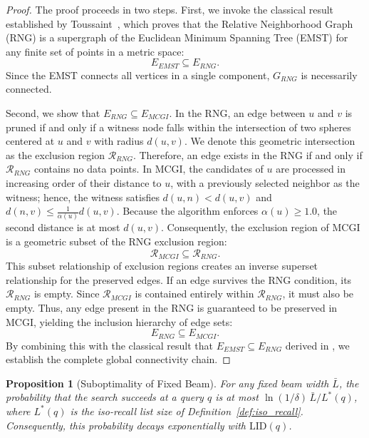 \documentclass{article}
\theoremstyle{plain}
\newtheorem{proposition}[theorem]{Proposition}
\theoremstyle{definition}
\theoremstyle{remark}
\newcommand{\ours}{MCGI\xspace}
\begin{document}
\begin{proof}
The proof proceeds in two steps. First, we invoke the classical result established by Toussaint~\cite{TOUSSAINT1980261}, which proves that the Relative Neighborhood Graph (RNG) is a supergraph of the Euclidean Minimum Spanning Tree (EMST) for any finite set of points in a metric space:
\begin{equation}
    E_{EMST} \subseteq E_{RNG}.
\end{equation}
Since the EMST connects all vertices in a single component, $G_{RNG}$ is necessarily connected.

Second, we show that $E_{RNG} \subseteq E_{MCGI}$. In the RNG, an edge between $u$ and $v$ is pruned if and only if a witness node falls within the intersection of two spheres centered at $u$ and $v$ with radius $d(u, v)$. We denote this geometric intersection as the exclusion region $\mathcal{R}_{RNG}$. Therefore, an edge exists in the RNG if and only if $\mathcal{R}_{RNG}$ contains no data points.
In \ours{}, the candidates of $u$ are processed in increasing order of their distance to $u$, with a previously selected neighbor as the witness; hence, the witness satisfies $d(u, n) < d(u, v)$ and $d(n, v) \le \frac{1}{\alpha(u)} d(u, v)$. Because the algorithm enforces $\alpha(u) \ge 1.0$, the second distance is at most $d(u, v)$. Consequently, the exclusion region of \ours{} is a geometric subset of the RNG exclusion region:
\begin{equation}
    \mathcal{R}_{MCGI} \subseteq \mathcal{R}_{RNG}.
\end{equation}
This subset relationship of exclusion regions creates an inverse superset relationship for the preserved edges. If an edge survives the RNG condition, its $\mathcal{R}_{RNG}$ is empty. Since $\mathcal{R}_{MCGI}$ is contained entirely within $\mathcal{R}_{RNG}$, it must also be empty. Thus, any edge present in the RNG is guaranteed to be preserved in \ours{}, yielding the inclusion hierarchy of edge sets:
\begin{equation}
    E_{RNG} \subseteq E_{MCGI}.
\end{equation}
By combining this with the classical result that $E_{EMST} \subseteq E_{RNG}$ derived in \cite{TOUSSAINT1980261}, we establish the complete global connectivity chain.
\end{proof}

\begin{proposition}[Suboptimality of Fixed Beam]
\label{proof:fixed_beam}
For any fixed beam width $\bar{L}$, the probability that the search succeeds at a query $q$ is at most $\ln(1/\delta)\, \bar{L}/L^*(q)$, where $L^*(q)$ is the iso-recall list size of Definition~\ref{def:iso_recall}. Consequently, this probability decays exponentially with $\mathrm{LID}(q)$.
\end{proposition}
\end{document}
